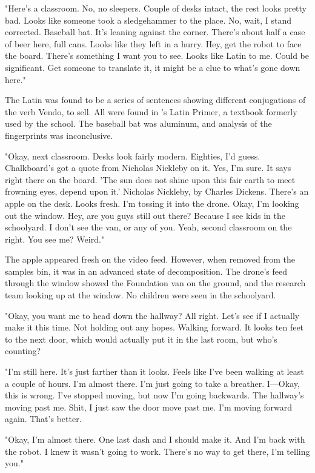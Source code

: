 "Here's a classroom. No, no sleepers. Couple of desks intact, the rest looks pretty bad. Looks like someone took a sledgehammer to the place. No, wait, I stand corrected. Baseball bat. It's leaning against the corner. There's about half a case of beer here, full cans. Looks like they left in a hurry. Hey, get the robot to face the board. There's something I want you to see. Looks like Latin to me. Could be significant. Get someone to translate it, it might be a clue to what's gone down here."

The Latin was found to be a series of sentences showing different conjugations of the verb Vendo, to sell. All were found in 's Latin Primer, a textbook formerly used by the school. The baseball bat was aluminum, and analysis of the fingerprints was inconclusive.

"Okay, next classroom. Desks look fairly modern. Eighties, I'd guess. Chalkboard's got a quote from Nicholas Nickleby on it. Yes, I'm sure. It says right there on the board. 'The sun does not shine upon this fair earth to meet frowning eyes, depend upon it.' Nicholas Nickleby, by Charles Dickens. There's an apple on the desk. Looks fresh. I'm tossing it into the drone. Okay, I'm looking out the window. Hey, are you guys still out there? Because I see kids in the schoolyard. I don't see the van, or any of you. Yeah, second classroom on the right. You see me? Weird."

The apple appeared fresh on the video feed. However, when removed from the samples bin, it was in an advanced state of decomposition. The drone's feed through the window showed the Foundation van on the ground, and the research team looking up at the window. No children were seen in the schoolyard.

"Okay, you want me to head down the hallway? All right. Let's see if I actually make it this time. Not holding out any hopes. Walking forward. It looks ten feet to the next door, which would actually put it in the last room, but who's counting?

"I'm still here. It's just farther than it looks. Feels like I've been walking at least a couple of hours. I'm almost there. I'm just going to take a breather. I—Okay, this is wrong. I've stopped moving, but now I'm going backwards. The hallway's moving past me. Shit, I just saw the door move past me. I'm moving forward again. That's better.

"Okay, I'm almost there. One last dash and I should make it. And I'm back with the robot. I knew it wasn't going to work. There's no way to get there, I'm telling you."

